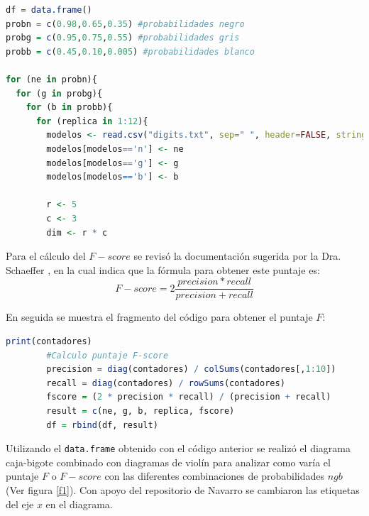 \documentclass{article}
\begin{document}
\lstset{style=mystyle}
\begin{lstlisting}[language=R, caption= Fragmento del código modificado.]
df = data.frame()
probn = c(0.98,0.65,0.35) #probabilidades negro
probg = c(0.95,0.75,0.55) #probabilidades gris
probb = c(0.45,0.10,0.005) #probabilidades blanco

for (ne in probn){
  for (g in probg){
    for (b in probb){
      for (replica in 1:12){
        modelos <- read.csv("digits.txt", sep=" ", header=FALSE, stringsAsFactors=F)
        modelos[modelos=='n'] <- ne
        modelos[modelos=='g'] <- g
        modelos[modelos=='b'] <- b
        
        r <- 5
        c <- 3
        dim <- r * c
\end{lstlisting}

Para el cálculo del $F-score$ se revisó la documentación sugerida por la Dra. Schaeffer \citep{2}, en la cual indica que la fórmula para obtener este puntaje es:  
\begin{equation}
\label{eq:e1}
F-score= 2\frac{precision * recall}{precision + recall} 
\end{equation}

En seguida se muestra el fragmento del código para obtener el puntaje $F$:

\lstset{style=mystyle}
\begin{lstlisting}[language=R, caption= Código para obtener el puntaje $F$.]
        print(contadores)
        #Calculo puntaje F-score
        precision = diag(contadores) / colSums(contadores[,1:10])
        recall = diag(contadores) / rowSums(contadores)
        fscore = (2 * precision * recall) / (precision + recall)
        result = c(ne, g, b, replica, fscore)
        df = rbind(df, result)
\end{lstlisting}

Utilizando el \texttt{data.frame} obtenido con el código anterior se realizó el diagrama caja-bigote combinado con diagramas de violín para analizar como varía el puntaje $F$ o $F-score$ con las diferentes combinaciones de probabilidades $ngb$ (Ver figura \ref{f1}). Con apoyo del repositorio de Navarro \citep{3} se cambiaron las etiquetas del eje $x$ en el diagrama.
\end{document}
